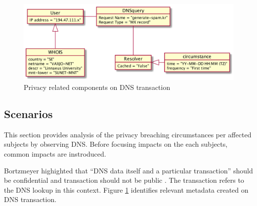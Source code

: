 \begin{figure}[ht!]
    \begin{center}
        \includegraphics*[width=\columnwidth]{img/privacyobject}
    \end{center}
    \caption{Privacy related components on DNS transaction}
    \label{privacyobject}
\end{figure}

\subsection{Scenarios}
This section provides analysis of the privacy breaching circumstances per affected subjects by observing DNS. Before focusing impacts on the each subjects, common impacts are instroduced.

Bortzmeyer highighted that ``DNS data itself and a particular transaction'' should be confidential and transaction should not be public \cite{rfc7626}. The transaction refers to the DNS lookup in this context.
Figure \ref{privacyobject} identifies relevant metadata created on DNS transaction. 